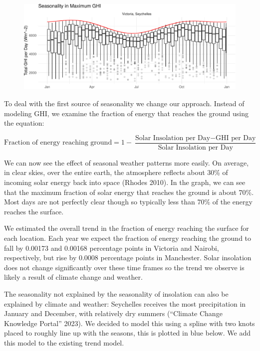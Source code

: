 \documentclass[
  letterpaper,
  DIV=11,
  numbers=noendperiod]{scrartcl}
\begin{document}
\begin{figure}

{\centering \includegraphics{FinalReport_files/figure-pdf/seychelles ghi-1.pdf}

}

\end{figure}

To deal with the first source of seasonality we change our approach.
Instead of modeling GHI, we examine the fraction of energy that reaches
the ground using the equation:

\[
\text{Fraction of energy reaching ground} = 1 - \frac{\text{Solar Insolation per Day} - \text{GHI per Day}}{\text{Solar Insolation per Day}}
\]

We can now see the effect of seasonal weather patterns more easily. On
average, in clear skies, over the entire earth, the atmosphere reflects
about 30\% of incoming solar energy back into space (Rhodes 2010). In
the graph, we can see that the maximum fraction of solar energy that
reaches the ground is about 70\%. Most days are not perfectly clear
though so typically less than 70\% of the energy reaches the surface.

We estimated the overall trend in the fraction of energy reaching the
surface for each location. Each year we expect the fraction of energy
reaching the ground to fall by 0.00173 and 0.00168 percentage points in
Victoria and Nairobi, respectively, but rise by 0.0008 percentage points
in Manchester. Solar insolation does not change significantly over these
time frames so the trend we observe is likely a result of climate change
and weather.

The seasonality not explained by the seasonality of insolation can also
be explained by climate and weather: Seychelles receives the most
precipitation in January and December, with relatively dry summers
({``Climate Change Knowledge Portal''} 2023). We decided to model this
using a spline with two knots placed to roughly line up with the
seasons, this is plotted in blue below. We add this model to the
existing trend model.
\end{document}
